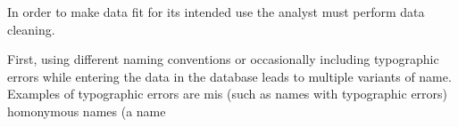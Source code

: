 
In order to make data fit for its intended use the analyst must perform data cleaning.




















First, using different naming conventions or occasionally including typographic errors while entering the data in the database leads to multiple variants of name.
Examples of typographic errors are mis
(such as names with typographic errors) homonymous names (a name
